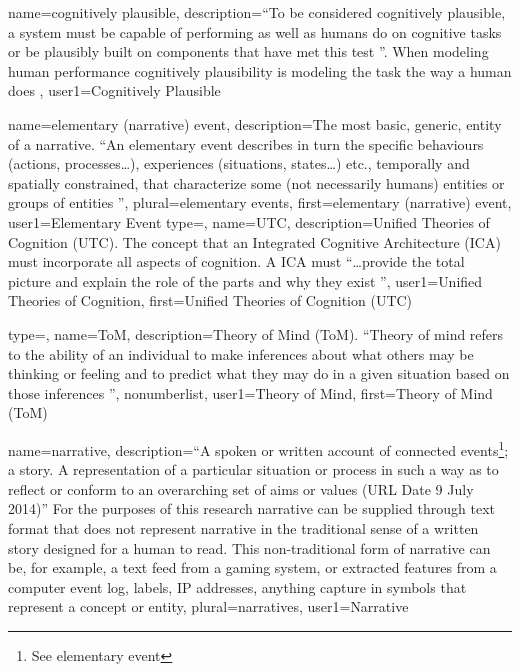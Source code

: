 {
  name=cognitively plausible,
  description={``To be considered cognitively plausible, a system must be capable of performing as well as humans do on cognitive tasks or be plausibly built on components that have met this test \citep{kennedycognitive}''. When modeling human performance cognitively plausibility is modeling the task the way a human does \citep{ACTR_6Tutorial2012} },
  user1={Cognitively Plausible}
}


{
  name=elementary (narrative) event,
  description={The most basic, generic, entity of a \gls{narrative}. ``An elementary event describes in turn the specific behaviours (actions, processes…), experiences (situations, states…) etc., temporally and spatially constrained, that characterize some (not necessarily humans) entities or groups of entities \citep{Zarri2012ElementaryEvents}''},
  plural=elementary events,
  first=elementary (narrative) event,
  user1={Elementary Event}
}
{
  type=\acronymtype,
  name=UTC,
  description={Unified Theories of Cognition (UTC). The concept that an Integrated Cognitive Architecture (ICA) must incorporate all aspects of cognition. A ICA must ``\dots provide the total picture and explain the role of the parts and why they exist \citep{newell1990unified}''},
  user1={Unified Theories of Cognition},
  first={Unified Theories of Cognition (UTC)}
}

{
  type=\acronymtype,
  name=ToM,
  description={Theory of Mind (ToM). ``Theory of mind refers to the ability of an individual to make inferences about what others may be thinking or feeling and to predict what they may do in a given situation based on those inferences \citep{schlinger2010theory}''},
  nonumberlist,
  user1={Theory of Mind},
  first={Theory of Mind (ToM)}
}

{
  name=narrative,
  description={``A spoken or written account of connected events\footnote{See \gls{elementary event}}; a story. A representation of a particular situation or process in such a way as to reflect or conform to an overarching set of aims or values \citep{Oxford2014} (URL Date 9 July 2014)'' For the purposes of this research \gls{narrative} can be supplied through text format that does not represent \gls{narrative} in the traditional sense of a written story designed for a human to read. This non-traditional form of \gls{narrative} can be, for example, a text feed from a gaming system, or extracted features from a computer event log, labels, IP addresses, anything capture in symbols that represent a concept or entity},
  plural=narratives,
  user1={Narrative}
}

